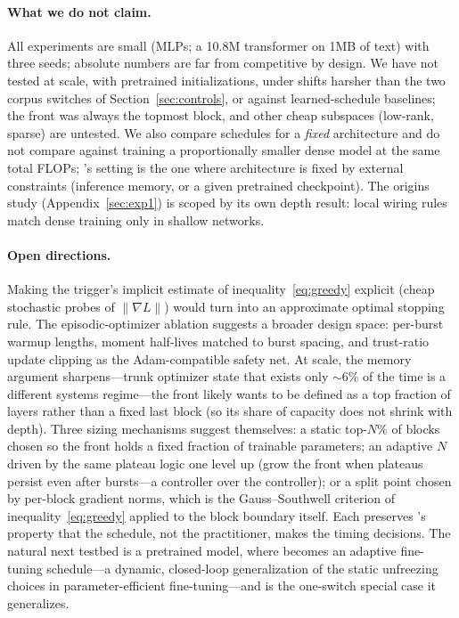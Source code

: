 \paragraph{What we do not claim.} All experiments are small (MLPs; a 10.8M
transformer on 1MB of text) with three seeds; absolute numbers are far from
competitive by design. We have not tested \fw{} at scale, with pretrained initializations,
under shifts harsher than the two corpus switches of
Section~\ref{sec:controls}, or against learned-schedule baselines; the front was always the topmost block, and other cheap subspaces
(low-rank, sparse) are untested. We also compare schedules for a
\emph{fixed} architecture and do not compare against training a
proportionally smaller dense model at the same total FLOPs; \fw{}'s
setting is the one where architecture is fixed by external constraints
(inference memory, or a given pretrained checkpoint). The origins study
(Appendix~\ref{sec:exp1}) is scoped by its own depth result: local wiring
rules match dense training only in shallow networks.

\paragraph{Open directions.} Making the trigger's implicit estimate of
inequality~\eqref{eq:greedy} explicit (cheap stochastic probes of
$\|\nabla L\|$) would turn \fw{} into an approximate optimal stopping rule.
The episodic-optimizer ablation suggests a broader design space:
per-burst warmup lengths, moment half-lives matched to burst spacing, and
trust-ratio update clipping as the Adam-compatible safety net. At scale, the
memory argument sharpens---trunk optimizer state that exists only ${\sim}6\%$ of
the time is a different systems regime---the front likely wants to be
defined as a top fraction of layers rather than a fixed last block (so its
share of capacity does not shrink with depth). Three sizing mechanisms
suggest themselves: a static top-$N\%$ of blocks chosen so the front holds
a fixed fraction of trainable parameters; an adaptive $N$ driven by the
same plateau logic one level up (grow the front when plateaus persist even
after bursts---a controller over the controller); or a split point chosen
by per-block gradient norms, which is the Gauss--Southwell criterion of
inequality~\eqref{eq:greedy} applied to the block boundary itself. Each
preserves \fw{}'s property that the schedule, not the practitioner, makes
the timing decisions. The natural next testbed
is a pretrained model, where \fw{} becomes an adaptive fine-tuning
schedule---a dynamic, closed-loop generalization of the static unfreezing
choices in parameter-efficient fine-tuning---and \lpft{} is the one-switch
special case it generalizes.

